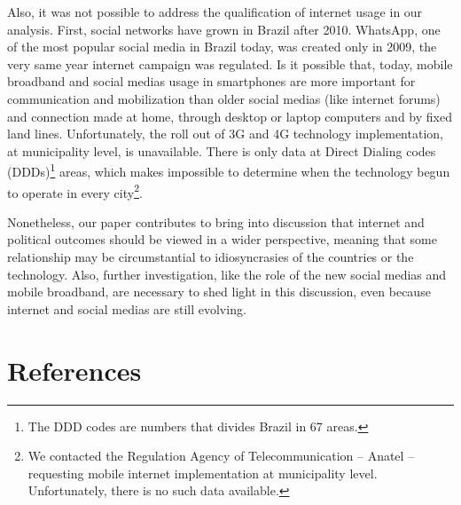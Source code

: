 \documentclass[
  12pt,
]{article}
\begin{document}
Also, it was not possible to address the qualification of internet usage
in our analysis. First, social networks have grown in Brazil after 2010.
WhatsApp, one of the most popular social media in Brazil today, was
created only in 2009, the very same year internet campaign was
regulated. Is it possible that, today, mobile broadband and social
medias usage in smartphones are more important for communication and
mobilization than older social medias (like internet forums) and
connection made at home, through desktop or laptop computers and by
fixed land lines. Unfortunately, the roll out of 3G and 4G technology
implementation, at municipality level, is unavailable. There is only
data at Direct Dialing codes (DDDs)\footnote{The DDD codes are numbers
  that divides Brazil in 67 areas.} areas, which makes impossible to
determine when the technology begun to operate in every city\footnote{We
  contacted the Regulation Agency of Telecommunication -- Anatel --
  requesting mobile internet implementation at municipality level.
  Unfortunately, there is no such data available.}.

Nonetheless, our paper contributes to bring into discussion that
internet and political outcomes should be viewed in a wider perspective,
meaning that some relationship may be circumstantial to idiosyncrasies
of the countries or the technology. Also, further investigation, like
the role of the new social medias and mobile broadband, are necessary to
shed light in this discussion, even because internet and social medias
are still evolving.

\hypertarget{references}{%
\section*{References}\label{references}}
\end{document}
